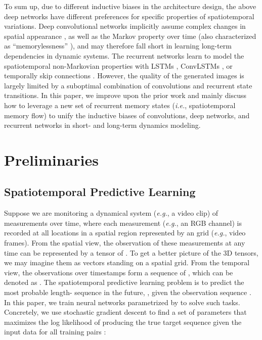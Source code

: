 \documentclass[10pt,journal,compsoc]{IEEEtran}
\begin{document}
To sum up, due to different inductive biases in the architecture design, the above deep networks have different preferences for specific properties of spatiotemporal variations.
Deep convolutional networks implicitly assume complex changes in spatial appearance \cite{Oh2015Action,Mathieu2015Deep,tulyakov2018mocogan}, as well as the Markov property over time (also characterized as ``memorylessness'' \cite{gagniuc2017markov}), and may therefore fall short in learning long-term dependencies in dynamic systems.
The recurrent networks learn to model the spatiotemporal non-Markovian properties with LSTMs \cite{srivastava2015unsupervised,villegas2017learning,denton2018stochastic,wichers2018hierarchical}, ConvLSTMs \cite{shi2015convolutional,babaeizadeh2017stochastic}, or temporally skip connections \cite{ebert2017self}. 
However, the quality of the generated images is largely limited by a suboptimal combination of convolutions and recurrent state transitions. 
In this paper, we improve upon the prior work and mainly discuss how to leverage a new set of recurrent memory states (\textit{i.e.}, spatiotemporal memory flow) to unify the inductive biases of convolutions, deep networks, and recurrent networks in short- and long-term dynamics modeling.














\section{Preliminaries}

\subsection{Spatiotemporal Predictive Learning}

Suppose we are monitoring a dynamical system (\textit{e.g.}, a video clip) of  measurements over time, where each measurement (\textit{e.g.}, an RGB channel) is recorded at all locations in a spatial region represented by an  grid (\textit{e.g.}, video frames). 
From the spatial view, the observation of these  measurements at any time can be represented by a tensor of . 
To get a better picture of the 3D tensors, we may imagine them as vectors standing on a spatial grid. 
From the temporal view, the observations over  timestamps form a sequence of , which can be denoted as . 
The spatiotemporal predictive learning problem is to predict the most probable length- sequence in the future, , given the observation sequence .
In this paper, we train neural networks parametrized by  to solve such tasks. Concretely, we use stochastic gradient descent to find a set of parameters  that maximizes the log likelihood of producing the true target sequence  given the input data  for all training pairs :
\end{document}
